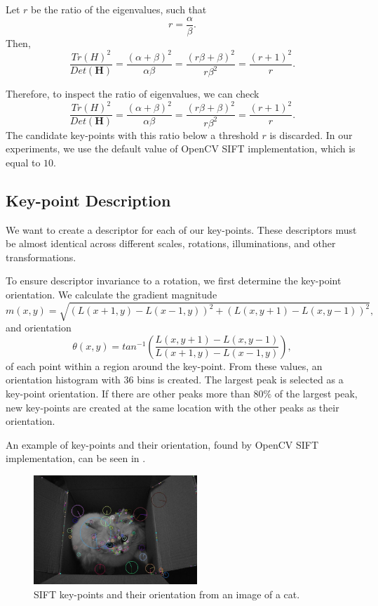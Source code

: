 Let $r$ be the ratio of the eigenvalues, such that
\begin{equation}
    r=\frac{\alpha}{\beta}.
\end{equation}
Then,
\begin{equation}
    \frac{Tr(H)^2}{Det(\boldsymbol{H})} = \frac{(\alpha+\beta)^2}{\alpha\beta}=\frac{(r\beta+\beta)^2}{r\beta^2} = \frac{(r+1)^2}{r}.
\end{equation}

Therefore, to inspect the ratio of eigenvalues, we can check
\begin{equation}
    \frac{Tr(H)^2}{Det(\boldsymbol{H})} = \frac{(\alpha+\beta)^2}{\alpha\beta}=\frac{(r\beta+\beta)^2}{r\beta^2} = \frac{(r+1)^2}{r}.
\end{equation}
The candidate key-points with this ratio below a threshold $r$ is discarded. In our experiments, we use the default value of OpenCV SIFT implementation, which is equal to $10$.

\subsection{Key-point Description}
We want to create a descriptor for each of our key-points. These descriptors must be almost identical across different scales, rotations, illuminations, and other transformations.

To ensure descriptor invariance to a rotation, we first determine the key-point orientation. We calculate the gradient magnitude
\begin{equation}
    m(x,y) = \sqrt{(L(x+1,y)-L(x-1,y))^2+(L(x,y+1)-L(x,y-1))^2},
\end{equation}
and orientation
\begin{equation}
    \theta(x,y) = tan^{-1}\left(\frac{L(x,y+1)-L(x,y-1)}{L(x+1,y)-L(x-1,y)}\right),
\end{equation}
of each point within a region around the key-point. From these values, an orientation histogram with $36$ bins is created. The largest peak is selected as a key-point orientation. If there are other peaks more than $80\%$ of the largest peak, new key-points are created at the same location with the other peaks as their orientation.

An example of key-points and their orientation, found by OpenCV SIFT implementation, can be seen in .
\begin{figure}[ht!]
    \centering
    \includegraphics[width=0.55\textwidth]{Figures/sift/sift_example.jpg}
    \caption[SIFT key-points and their orientation from an image of a cat]{SIFT key-points and their orientation from an image of a cat.}
    \label{fig:sift_example}
\end{figure}

